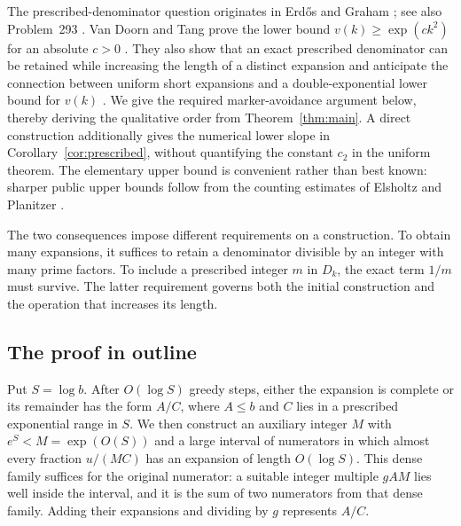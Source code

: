 The prescribed-denominator question originates in Erd\H{o}s and Graham
\cite[p.~35]{ErdosGraham1980}; see also Problem~293 \cite{Bloom293}.
Van Doorn and Tang prove the lower bound $v(k)\ge\exp(c k^2)$ for
an absolute $c>0$ \cite[Theorem~1.1]{vanDoornTang2026}. They also show
that an exact prescribed denominator can be
retained while increasing the length of a distinct expansion
\cite[Lemma~2.1]{vanDoornTang2026} and anticipate the connection
between uniform short expansions and a double-exponential lower bound
for $v(k)$ \cite[Section~3]{vanDoornTang2026}. We give the required
marker-avoidance argument below, thereby deriving the qualitative order
from Theorem~\ref{thm:main}. A direct construction additionally gives
the numerical lower slope in Corollary~\ref{cor:prescribed}, without
quantifying the constant $c_2$ in the uniform theorem. The elementary
upper bound is convenient rather than best known: sharper public upper
bounds follow from the counting estimates of Elsholtz and Planitzer
\cite[Corollary~3(2)]{ElsholtzPlanitzer2021}.

The two consequences impose different requirements on a construction.
To obtain many expansions, it suffices to retain a denominator divisible
by an integer with many prime factors. To include a prescribed integer
$m$ in $D_k$, the exact term $1/m$ must survive. The latter requirement
governs both the initial construction and the operation that increases
its length.

\subsection*{The proof in outline}

Put $S=\log b$. After $O(\log S)$ greedy steps, either the expansion
is complete or its remainder has the form $A/C$, where $A\le b$ and
$C$ lies in a prescribed exponential range in $S$.
We then construct an auxiliary integer $M$ with $e^S<M=\exp(O(S))$
and a large interval of numerators in which almost every fraction $u/(MC)$ has
an expansion of length $O(\log S)$. This dense family suffices for
the original numerator: a suitable integer multiple $gAM$ lies well
inside the interval, and it is the sum of two numerators from that dense family.
Adding their expansions and dividing by $g$ represents $A/C$.

